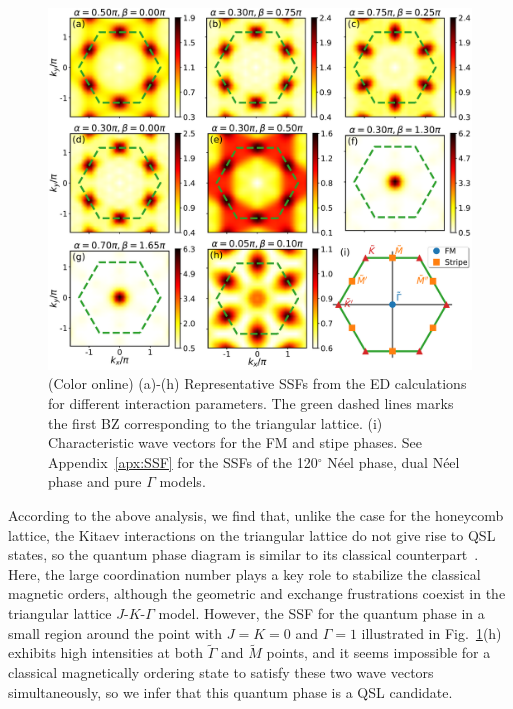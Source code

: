 \documentclass[aps,prb,reprint,amsfonts,amsmath,amssymb,showpacs,groupedaddress,superscriptaddress]{revtex4-1}
\begin{document}
\begin{figure}
    \centering
    \includegraphics[width=\columnwidth]{fig/StructureFactors.pdf}
    \caption{\label{fig:StructureFactors}(Color online) (a)-(h) Representative SSFs from the ED calculations for different interaction parameters. The green dashed lines marks the first BZ corresponding to the triangular lattice. (i) Characteristic wave vectors for the FM and stipe phases. See Appendix~\ref{apx:SSF} for the SSFs of the 120$^\circ$ N\'{e}el phase, dual N\'{e}el phase and pure $\Gamma$ models.}
\end{figure}

According to the above analysis, we find that, unlike the case for the honeycomb lattice, the Kitaev interactions on the triangular lattice do not give rise to QSL states, so the quantum phase diagram is similar to its classical counterpart~\cite{PhysRevB.92.165108}. Here, the large coordination number plays a key role to stabilize the classical magnetic orders, although the geometric and exchange frustrations coexist in the triangular lattice $J$-$K$-$\Gamma$ model. However, the SSF for the quantum phase in a small region around the point with $J=K=0$ and $\Gamma=1$ illustrated in Fig.~\ref{fig:StructureFactors}(h) exhibits high intensities at both $\tilde{\Gamma}$ and $\tilde{M}$ points, and it seems impossible for a classical magnetically ordering state to satisfy these two wave vectors simultaneously, so we infer that this quantum phase is a QSL candidate.
\end{document}
